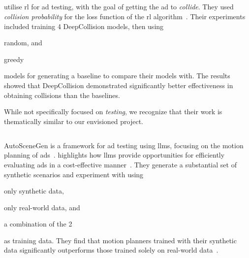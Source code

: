 \subsection{}

\citeauthor{deepCollision} utilise \acrfull{rl} for \acrshort{ad} testing, with the goal of getting
the \acrshort{ad} to \textit{collide}. They used \textit{collision probability} for the loss
function of the \acrlong{rl} algorithm~\cite[384]{deepCollision}. Their experiments included
training 4 DeepCollision models, then using \begin{inparaenum}
    \item random, and
    \item greedy
\end{inparaenum} models for generating a baseline to compare their models with. The results showed
that DeepCollision demonstrated significantly better effectiveness in obtaining collisions than the
baselines.

\begin{Note}
    While not specifically focused on \textit{testing}, we recognize that their work is thematically
    similar to our envisioned project.
\end{Note}

\subsection{}

AutoSceneGen is a framework for \acrshort{ad} testing using \acrshort{llms},
focusing on the motion planning of \acrlong{ads}~\cite[14539]{autoSceneGen}.
\citeauthor{autoSceneGen} highlights how \acrshort{llms} provide opportunities
for efficiently evaluating \acrshort{ads} in a cost-effective
manner~\cite[14539-14540]{autoSceneGen}. They generate a substantial set of synthetic scenarios and
experiment with using \begin{inparaenum}
    \item only synthetic data,
    \item only real-world data, and
    \item a combination of the \num{2} \end{inparaenum} as training data. They find that motion
planners trained with their synthetic data significantly outperforms those trained solely on
real-world data~\cite[14539]{autoSceneGen}.

\subsection{}

